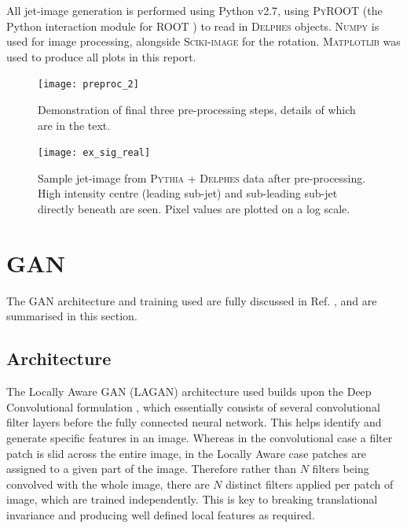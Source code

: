 \documentclass{report}
\newcommand{\pkg}[1]{\textsc{#1}}
\begin{document}
All jet-image generation is performed using Python v2.7, using \pkg{PyROOT} (the Python interaction module for \pkg{ROOT} \cite{root}) to read in \pkg{Delphes} objects. \pkg{Numpy} \cite{numpy} is used for image processing, alongside \pkg{Sciki-image} \cite{skimage} for the rotation. \pkg{Matplotlib} \cite{matplotlib} was used to produce all plots in this report.

\begin{figure}[H]
	\centering
	\texttt{[image: preproc\_2]}
%	
	
	\caption{Demonstration of final three pre-processing steps, details of which are in the text.}
	\label{fig:preproc}
	
\end{figure}

\begin{figure}[H]
	\centering
	\texttt{[image: ex\_sig\_real]}
	
	\caption{Sample jet-image from \pkg{Pythia} + \pkg{Delphes} data after pre-processing. High intensity centre (leading sub-jet) and sub-leading sub-jet directly beneath are seen. Pixel values are plotted on a log scale.}
	\label{fig:ex_sig_real}
	
\end{figure}

\section{GAN}
The GAN architecture and training used are fully discussed in Ref. \cite{de2017learning}, and are summarised in this section.
 
\subsection{Architecture}
The Locally Aware GAN (LAGAN) architecture used builds upon the Deep Convolutional formulation \cite{Radford2015}, which essentially consists of several convolutional filter layers before the fully connected neural network. This helps identify and generate specific features in an image. Whereas in the convolutional case a filter patch is slid across the entire image, in the Locally Aware case patches are assigned to a given part of the image. Therefore rather than $N$ filters being convolved with the whole image, there are $N$ distinct filters applied per patch of image, which are trained independently. This is key to breaking translational invariance and producing well defined local features as required.
\end{document}
